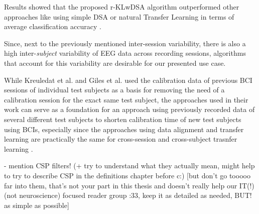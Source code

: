 Results showed that the proposed r-KLwDSA algorithm outperformed other approaches like using simple DSA or natural Transfer Learning in terms of average classification accuracy \cite{giles-2022}. %

Since, next to the previously mentioned inter-session variability, there is also a high inter-\emph{subject} variability of EEG data across recording sessions, algorithms that account for this variability are desirable for our presented use case. %

While Kreuledat et al. and Giles et al. used the calibration data of previous BCI sessions of individual test subjects as a basis for removing the need of a calibration session for the exact same test subject, the approaches used in their work can serve as a foundation for an approach using previously recorded data of several different test subjects to shorten calibration time of new test subjects using BCIs, especially since the approaches using data alignment and transfer learning are practically the same for cross-session and cross-subject trasnfer learning \cite{wu-2020}. %


- mention CSP filters! (+ try to understand what they actually mean, might help to try to describe CSP in the definitions chapter before c:) [but don't go tooooo far into them, that's not your part in this thesis and doesn't really help our IT(!) (not neuroscience) focused reader group :33, keep it as detailed as needed, BUT! as simple as possible]



